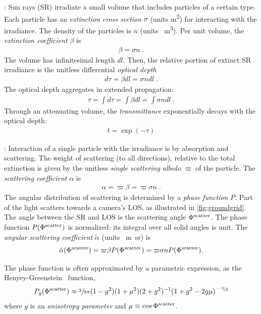 \documentclass[10pt,letterpaper]{article}
\begin{document}
: Sun rays (SR) irradiate a small volume
that includes particles of a certain type.  Each particle has an {\em
  extinction cross section} $\sigma$ (units \si{\meter\squared}) for
interacting with the irradiance. The density of the particles is $n$
(units \si[sticky-per]{\per\cubic\metre}). Per unit volume, the {\em
  extinction coefficient} $\beta$ is
\begin{align}
  \beta= \sigma n \;.
  \label{eq:extinctc}
\end{align}
The volume has infinitesimal length $dl$. Then, the relative portion
of extinct SR irradiance is the unitless differential {\em optical
  depth}
\begin{align}
  d\tau= \beta dl=\sigma n dl \;.
  \label{eq:extinct}
\end{align}
The optical depth aggregates in extended propagation:
\begin{align}
  \tau= \int d\tau=\int \beta dl=\int \sigma n dl \;.
  \label{eq:tau}
\end{align}
Through an attenuating volume, the {\em transmittance} exponentially
decays with the optical depth:
\begin{align}
  t=\exp(-\tau)
  \label{eq:beer-lambert}
\end{align}

: Interaction of a single particle with the
irradiance is by absorption and scattering. The weight of scattering
(to all directions), relative to the total extinction is given by the
unitless {\em single scattering albedo} $\varpi$ of the particle. The
{\em scattering coefficient} $\alpha$ is
\begin{align}
  \alpha= \varpi\beta=\varpi \sigma n \;.
  \label{eq:alph}
\end{align}
The angular distribution of scattering is determined by a {\em phase
  function} $P$. Part of the light scatters towards a camera's LOS, as
illustrated in \cref{fig:groundgrid}. The angle between the SR and LOS
is the scattering angle $\Phi^{\rm scatter}$. The phase function
$P(\Phi^{\rm scatter})$ is normalized: its integral over all solid
angles is unit. The {\em angular scattering coefficient}
$\tilde\alpha$ (units \si[sticky-per]{\per\meter\steradian}) is
\begin{align}
  \tilde\alpha(\Phi^{\rm scatter}) = \varpi\beta P(\Phi^{\rm scatter})
  = \varpi \sigma n P(\Phi^{\rm scatter}).
  \label{eq:alphabasic}
\end{align}

The phase function is often approximated by a parametric expression,
as the Henyey-Greenstein~\cite{Cornette1995} function,
\begin{align}
  P_g(\Phi^{\rm scatter})\approx \sfrac{3}{8\pi} (1 - g^2)(1+\mu^2)
  (2+g^2)^{-1}(1 + g^2 - 2g\mu)^{\sfrac{-3}{2}}
  \label{eq:aerosol_scatter}
\end{align}
where $g$ is an {\em anisotropy parameter} and $\mu\equiv \cos \Phi^{\rm scatter}$.
\\
\end{document}
